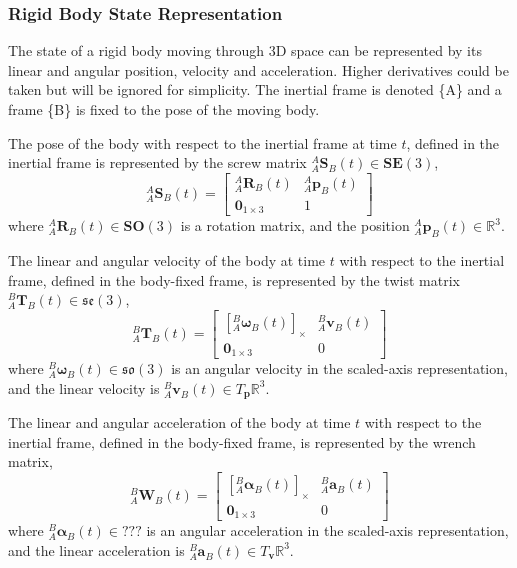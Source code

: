 	\subsubsection{Rigid Body State Representation} \label{state rep}
		The state of a rigid body moving through 3D space can be represented by its linear and angular position, velocity and acceleration. Higher derivatives could be taken but will be ignored for simplicity.
		The inertial frame is denoted \{A\} and a frame \{B\} is fixed to the pose of the moving body.
		
		The pose of the body with respect to the inertial frame at time $t$, defined in the inertial frame is represented by the screw matrix ${^{A}_{A}\mathbf{S}^{}_{B}(t)} \in \mathbf{SE}(3)$,
		\begin{equation}
				{^{A}_{A}\mathbf{S}^{}_{B}(t)} = 
				\begin{bmatrix}
						  ^{A}_{A}\mathbf{R}^{}_{B}(t) 	& 	^{A}_{A}\mathbf{p}^{}_{B}(t)\\
						  \textbf{0}_{1 \times 3} & 1						  
				\end{bmatrix}
		\end{equation}
		where $^{A}_{A}\mathbf{R}^{}_{B}(t) \in \mathbf{SO}(3)$ is a rotation matrix, and the position $^{A}_{A}\mathbf{p}^{}_{B}(t) \in \mathbb{R}^3$.
		
		The linear and angular velocity of the body at time $t$ with respect to the inertial frame, defined in the body-fixed frame, is represented by the twist matrix ${^{B}_{A}\mathbf{T}^{}_{B}(t)} \in \mathfrak{se}(3)$,
		\begin{equation}
				{^{B}_{A}\mathbf{T}^{}_{B}(t)} = 
				\begin{bmatrix}
		  {[^{B}_{A}\mathbf{\omega}^{}_{B}(t)]_\times} 	& 	^{B}_{A}\mathbf{v}^{}_{B}(t)\\
		  \textbf{0}_{1 \times 3} & 0						  
				\end{bmatrix}
		\end{equation}
		where $^{B}_{A}\mathbf{\omega}^{}_{B}(t) \in \mathfrak{so}(3)$ is an angular velocity in the scaled-axis representation, and the linear velocity is $^{B}_{A}\mathbf{v}^{}_{B}(t) \in T_\mathbf{p}\mathbb{R}^3$.
				
		The linear and angular acceleration of the body at time $t$ with respect to the inertial frame, defined in the body-fixed frame, is represented by the wrench matrix,
		\begin{equation}
				{^{B}_{A}\mathbf{W}^{}_{B}(t)} = 
				\begin{bmatrix}
				  {[^{B}_{A}\mathbf{\alpha}^{}_{B}(t)]_\times} 	& 	^{B}_{A}\mathbf{a}^{}_{B}(t)\\
				  \textbf{0}_{1 \times 3} & 0						  
				\end{bmatrix}
		\end{equation}
		where $^{B}_{A}\mathbf{\alpha}^{}_{B}(t) \in ???$ is an angular acceleration in the scaled-axis representation, and the linear acceleration is $^{B}_{A}\mathbf{a}^{}_{B}(t) \in T_\mathbf{v}\mathbb{R}^3$.
						
